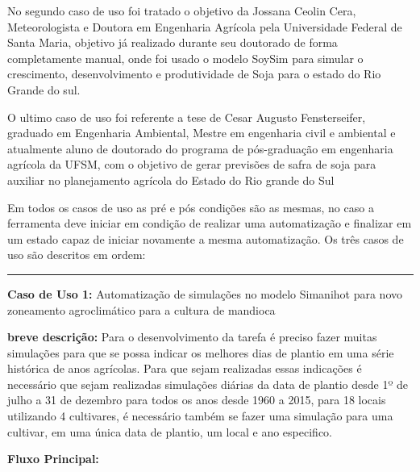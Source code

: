 \documentclass[12pt]{article}
\begin{document}
	No segundo caso de uso foi tratado o objetivo da Jossana Ceolin Cera, Meteorologista e Doutora em Engenharia Agrícola pela Universidade Federal de Santa Maria, objetivo já realizado durante seu doutorado de forma completamente manual, onde foi usado o modelo SoySim para simular o crescimento, desenvolvimento e produtividade de Soja para o estado do Rio Grande do sul.

	O ultimo caso de uso foi referente a tese de Cesar Augusto Fensterseifer, graduado em Engenharia Ambiental, Mestre em engenharia civil e ambiental e atualmente aluno de doutorado do programa de pós-graduação em engenharia agrícola da UFSM, com o objetivo de gerar previsões de safra de soja para auxiliar no planejamento agrícola do Estado do Rio grande do Sul 
	
	Em todos os casos de uso as pré e pós condições são as mesmas, no caso a ferramenta deve iniciar em condição de realizar uma automatização e finalizar em um estado capaz de iniciar novamente a mesma automatização. Os três casos de uso são descritos em ordem:
	\bigskip \bigskip \bigskip \bigskip


	\hrule \bigskip

	{\bf Caso de Uso 1:} Automatização de simulações no modelo Simanihot para novo zoneamento agroclimático para a cultura de mandioca 
	\bigskip
	
	{\bf breve descrição:} Para o desenvolvimento da tarefa é preciso fazer muitas simulações para que se possa indicar os melhores dias de plantio em uma série histórica de anos agrícolas. Para que sejam realizadas essas indicações é necessário que sejam realizadas simulações diárias da data de plantio desde 1º de julho a 31 de dezembro para todos os anos desde 1960 a 2015, para 18 locais utilizando 4 cultivares, é necessário também se fazer uma simulação para uma cultivar, em uma única data de plantio, um local e ano especifico. 
	\bigskip
	
	{\bf Fluxo Principal:}
	
\end{document}

